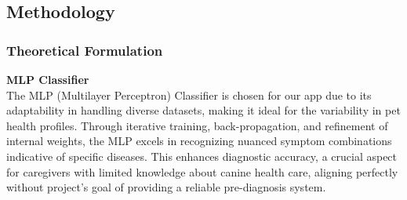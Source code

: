 
\subsection{Methodology}

\subsubsection{Theoretical Formulation}

    \textbf{MLP Classifier} \\
    The MLP (Multilayer Perceptron) Classifier is chosen for our app due to its adaptability in handling diverse datasets, making it ideal for the variability in pet health profiles. Through iterative training, back-propagation, and refinement of internal weights, the MLP excels in recognizing nuanced symptom combinations indicative of specific diseases. This enhances diagnostic accuracy, a crucial aspect for caregivers with limited knowledge about canine health care, aligning perfectly without project's goal of providing a reliable pre-diagnosis system.
    
